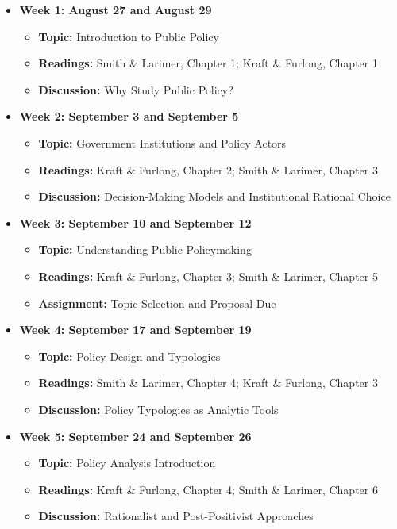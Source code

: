 \documentclass[12pt, letterpaper]{article}
\begin{document}
\begin{itemize}
    \item \textbf{Week 1: August 27 and August 29}
    \begin{itemize}
        \item \textbf{Topic:} Introduction to Public Policy
        \item \textbf{Readings:} Smith \& Larimer, Chapter 1; Kraft \& Furlong, Chapter 1
        \item \textbf{Discussion:} Why Study Public Policy?
    \end{itemize}

    \item \textbf{Week 2: September 3 and September 5}
    \begin{itemize}
        \item \textbf{Topic:} Government Institutions and Policy Actors
        \item \textbf{Readings:} Kraft \& Furlong, Chapter 2; Smith \& Larimer, Chapter 3
        \item \textbf{Discussion:} Decision-Making Models and Institutional Rational Choice
    \end{itemize}

    \item \textbf{Week 3: September 10 and September 12}
    \begin{itemize}
        \item \textbf{Topic:} Understanding Public Policymaking
        \item \textbf{Readings:} Kraft \& Furlong, Chapter 3; Smith \& Larimer, Chapter 5
        \item \textbf{Assignment:} Topic Selection and Proposal Due
    \end{itemize}

    \item \textbf{Week 4: September 17 and September 19}
    \begin{itemize}
        \item \textbf{Topic:} Policy Design and Typologies
        \item \textbf{Readings:} Smith \& Larimer, Chapter 4; Kraft \& Furlong, Chapter 3
        \item \textbf{Discussion:} Policy Typologies as Analytic Tools
    \end{itemize}

    \item \textbf{Week 5: September 24 and September 26}
    \begin{itemize}
        \item \textbf{Topic:} Policy Analysis Introduction
        \item \textbf{Readings:} Kraft \& Furlong, Chapter 4; Smith \& Larimer, Chapter 6
        \item \textbf{Discussion:} Rationalist and Post-Positivist Approaches
    \end{itemize}


\end{itemize}
\end{document}
